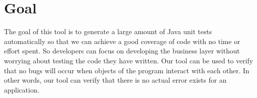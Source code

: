 \section{Goal}
\label{sec:Goal}
The goal of this tool is to generate a large amount of Java unit tests automatically so that we can achieve a good coverage of code with no time or effort spent. So developers can focus on developing the business layer without worrying about testing the code they have written.
Our tool can be used to verify that no bugs will occur when objects of the program interact with each other. In other words, our tool can verify that there is no actual error exists for an application.